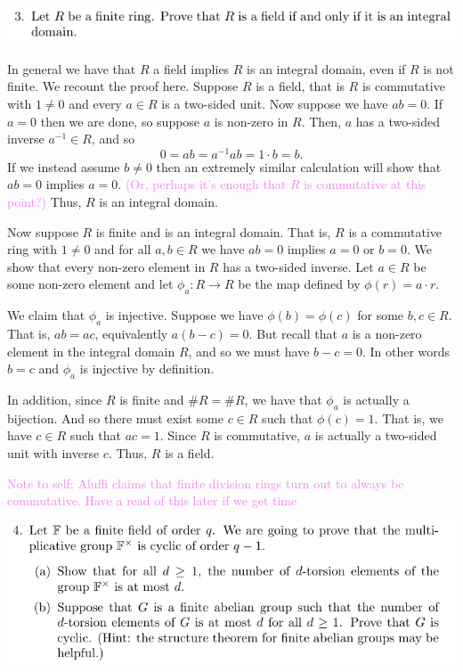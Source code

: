 \documentclass[12pt,letterpaper,boxed]{hmcpset}
\newcommand{\wg}[1]{\textcolor{violet}{#1}}
\newcommand{\inv}{^{-1}}
\begin{document}
\begin{problem}
	\includegraphics[scale=0.8]{3.png}
	\hfill
\end{problem}
\begin{solution}
In general we have that $R$ a field implies $R$ is an integral domain,
even if $R$ is not finite. We recount the proof here.
Suppose $R$ is a field, that is $R$ is commutative with $1 \neq 0$ and
every $a \in R$ is a two-sided unit. Now suppose we have $ab = 0$.
If $a = 0$ then we are done, so suppose 
$a$ is non-zero in
$R$. Then, $a$ has a two-sided inverse $a\inv \in R$, and so \[
	0 = ab = a\inv a b = 1 \cdot b = b.
\]
If we instead assume $b \neq 0$ then 
an extremely similar calculation will show that $ab = 0$ implies $a =
0$. \wg{(Or, perhaps it's enough that $R$ is commutative at this
point?)} 
Thus, $R$ is an integral domain.

Now suppose $R$ is finite and is an integral domain. That is, $R$ is a
commutative ring with $1 \neq 0$ and for all $a,b \in R$ we have $ab =
0$ implies $a = 0$ or $b = 0$. We show that every non-zero element in
$R$ has a two-sided inverse.
Let $a \in R$ be some non-zero element and let $\phi_a: R \to R$ be
the map defined by $\phi(r) = a\cdot r$. 

We claim that $\phi_a$ is
injective. Suppose we have $\phi(b) = \phi(c)$ for some $b,c \in R$.
That is, $ab = ac$, equivalently $a(b-c)= 0$. But recall that $a$ is a
non-zero element in the integral domain $R$, and so we must have $b-c = 0$. In
other words $b = c$ and $\phi_a$ is injective by definition.

In addition, since $R$ is finite and $\# R = \# R$, we have that
$\phi_a$ is actually a bijection. And so there must exist some $c \in
R$ such that $\phi(c) = 1$. That is, we have $c \in R$ such that $a c
= 1$. Since $R$ is commutative, $a$ is actually a two-sided unit with
inverse $c$. Thus, $R$ is a field.

\wg{Note to self: Aluffi claims that finite division rings turn out to
always be commutative. Have a read of this later if we get time}
\end{solution}

\newpage


\begin{problem}
	\includegraphics[scale=0.8]{4.png}
	\hfill
\end{problem}
\end{document}
